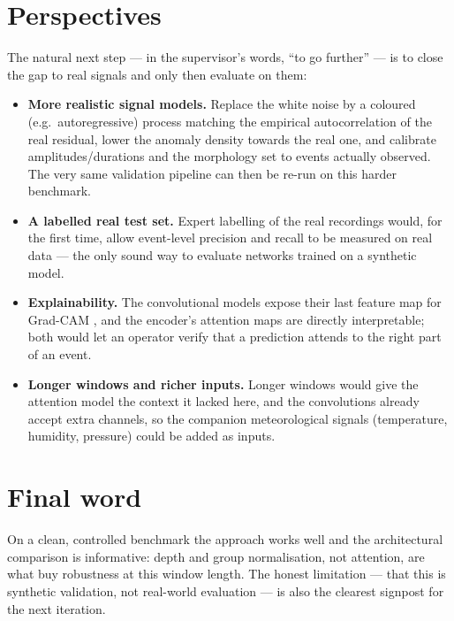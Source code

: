 \section{Perspectives}
\label{sec:conc-future}

The natural next step --- in the supervisor's words, ``to go further'' --- is to
close the gap to real signals and only then evaluate on them:
\begin{itemize}[leftmargin=*, itemsep=0.25em]
    \item \textbf{More realistic signal models.} Replace the white noise by a
    coloured (e.g.\ autoregressive) process matching the empirical
    autocorrelation of the real residual, lower the anomaly density towards the
    real one, and calibrate amplitudes/durations and the morphology set to events
    actually observed. The very same validation pipeline can then be re-run on
    this harder benchmark.
    \item \textbf{A labelled real test set.} Expert labelling of the real
    recordings would, for the first time, allow event-level precision and recall
    to be measured on real data --- the only sound way to evaluate networks
    trained on a synthetic model.
    \item \textbf{Explainability.} The convolutional models expose their last
    feature map for Grad-CAM \cite{selvaraju2017gradcam}, and the encoder's
    attention maps are directly interpretable; both would let an operator verify
    that a prediction attends to the right part of an event.
    \item \textbf{Longer windows and richer inputs.} Longer windows would give
    the attention model the context it lacked here, and the convolutions already
    accept extra channels, so the companion meteorological signals (temperature,
    humidity, pressure) could be added as inputs.
\end{itemize}

\section{Final word}
\label{sec:conc-final}

On a clean, controlled benchmark the approach works well and the architectural
comparison is informative: depth and group normalisation, not attention, are what
buy robustness at this window length. The honest limitation --- that this is
synthetic validation, not real-world evaluation --- is also the clearest signpost
for the next iteration.
